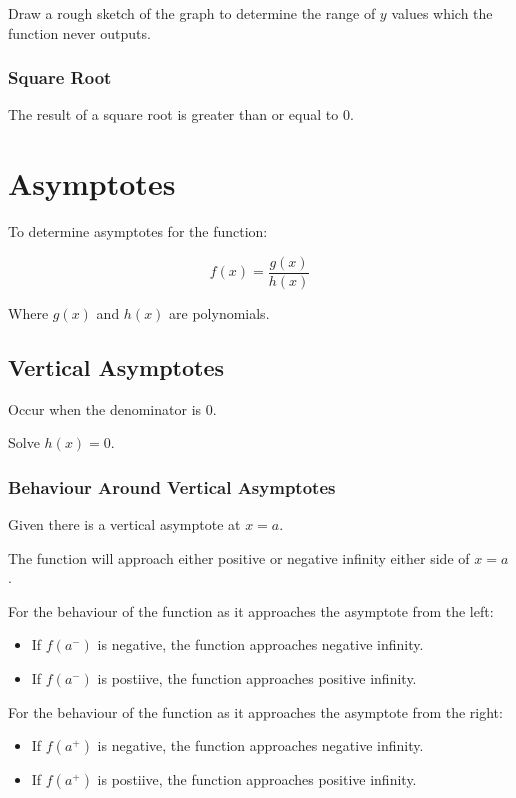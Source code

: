 \documentclass[a4paper,11pt]{article}
\begin{document}
Draw a rough sketch of the graph to determine the range of $y$ values which the
function never outputs.


\subsubsection{Square Root}

The result of a square root is greater than or equal to 0.




\section{Asymptotes}

To determine asymptotes for the function:

$$
f(x) = \frac{g(x)}{h(x)}
$$

Where $g(x)$ and $h(x)$ are polynomials.


\subsection{Vertical Asymptotes}

Occur when the denominator is 0.

Solve $h(x) = 0$.


\subsubsection{Behaviour Around Vertical Asymptotes}

Given there is a vertical asymptote at $x = a$.

The function will approach either positive or negative infinity either side of
$x = a$.

For the behaviour of the function as it approaches the asymptote from the left:

\begin{itemize}
\item If $f(a^-)$ is negative, the function approaches negative infinity.
\item If $f(a^-)$ is postiive, the function approaches positive infinity.
\end{itemize}

For the behaviour of the function as it approaches the asymptote from the right:

\begin{itemize}
\item If $f(a^+)$ is negative, the function approaches negative infinity.
\item If $f(a^+)$ is postiive, the function approaches positive infinity.
\end{itemize}
\end{document}
